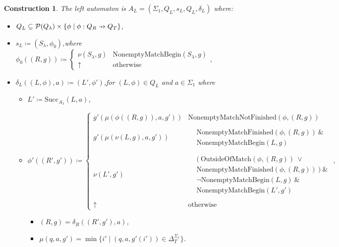 \documentclass{article}
\newtheorem{construction}[definition]{Construction}
\newcommand\pfun{\mathrel{\ooalign{\hfil$\mapstochar\mkern5mu$\hfil\cr$\to$\cr}}}
\begin{document}
\begin{construction}
		The left automaton is $A_L = (\Sigma_1, Q_L, s_L, Q_L, \delta_L)$ where:
		\begin{itemize}
			\item \( Q_L\subseteq \mathcal{P}(Q_\lambda) \times \{ \phi\mid\phi: Q_R\pfun Q_T \} \),
			\item \( s_L \coloneq (S_\lambda, \phi_0) \),\quad where \( \phi_0((R, g)) \coloneq 
			\begin{cases}
				\nu(S_\lambda, g) & \mathrm{NonemptyMatchBegin}(S_\lambda, g) \\
				\uparrow & \text{otherwise}
			\end{cases}
			\),
			\item \( \delta_L((L, \phi), a) \coloneq (L', \phi') \),\quad for $(L, \phi)\in Q_L$ and $a\in\Sigma_1$ where
			\begin{itemize}
				\item \( L' \coloneq \mathrm{Succ}_{A_\lambda}(L, a) \),
				\item \( \phi'((R', g')) \coloneq
				\begin{cases}
					g'(\mu(\phi((R,g)), a, g')) & \mathrm{NonemptyMatchNotFinished}(\phi, (R, g)) \\\\
					g'(\mu(\nu(L, g), a, g')) 	&
						\begin{aligned}
							&\mathrm{NonemptyMatchFinished}(\phi, (R, g)) \ \& \\
							&\mathrm{NonemptyMatchBegin}(L, g)
						\end{aligned} \\\\
					\nu(L', g')					&
						\begin{aligned}
							&(\ \mathrm{OutsideOfMatch}(\phi, (R, g))\ \lor \\
							&\mathrm{NonemptyMatchFinished}(\phi, (R, g))\ )\ \& \\
							&\lnot\mathrm{NonemptyMatchBegin}(L, g)\ \& \\
							&\mathrm{NonemptyMatchBegin}(L', g')
						\end{aligned} \\\\
					\uparrow 					& \text{otherwise}
				\end{cases}, \)
				\begin{itemize}
					\item \( (R,g) = \delta_R((R', g'), a) \),
					\item \( \mu(q, a, g') = \min\{ i' \mid (q, a, g'(i'))\in \Delta_T^{\Sigma_1} \} \).
				\end{itemize}
			\end{itemize}
		\end{itemize}
		

\end{construction}
\end{document}
